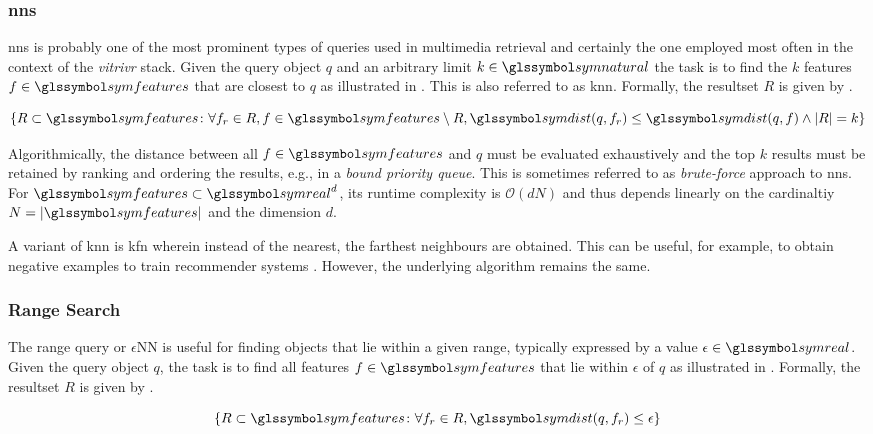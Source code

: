 \subsubsection{\acrfull{nns}}

\acrshort{nns} is probably one of the most prominent types of queries used in multimedia retrieval and certainly the one employed most often in the context of the \emph{vitrivr} \cite{Rossetto:2016vitrivr,Gasser:2019multimodal} stack. Given the query object $q$ and an arbitrary limit $k \in \symnatural$ the task is to find the $k$ features $f \in \symfeatures$ that are closest to $q$ as illustrated in . This is also referred to as \acrfull{knn}. Formally, the resultset $R$ is given by .

\begin{equation}
    \label{eq:knn}
    \lbrace R \subset \symfeatures \colon \forall f_r \in R, f \in \symfeatures \setminus R, \symdist(q,f_r) \leq \symdist(q,f) \wedge |R| = k \rbrace
\end{equation}

Algorithmically, the distance between all $f \in \symfeatures$ and $q$ must be evaluated exhaustively and the top $k$ results must be retained by ranking and ordering the results, e.g., in a \emph{bound priority queue}. This is sometimes referred to as \emph{brute-force} approach to \acrshort{nns}. For $\symfeatures \subset \symreal^d$, its runtime complexity is $\mathcal{O}(dN)$ and thus depends linearly on the cardinaltiy $N = |\symfeatures|$ and the dimension $d$. 

A variant of \acrshort{knn} is \acrfull{kfn} wherein instead of the nearest, the farthest neighbours are obtained. This can be useful, for example, to obtain negative examples to train recommender systems \cite{Pagh:2015Approximate}. However, the underlying algorithm remains the same.

\subsubsection{Range Search}

The range query or $\epsilon$NN is useful for finding objects that lie within a given range, typically expressed by a value $\epsilon \in \symreal$. Given the query object $q$, the task is to find all features $f \in \symfeatures$ that lie within $\epsilon$ of $q$ as illustrated in . Formally, the resultset $R$ is given by .

\begin{equation}
    \label{eq:epsilonnn}
    \lbrace R \subset \symfeatures \colon \forall f_r \in R, \symdist(q,f_r) \leq \epsilon \rbrace
\end{equation}

